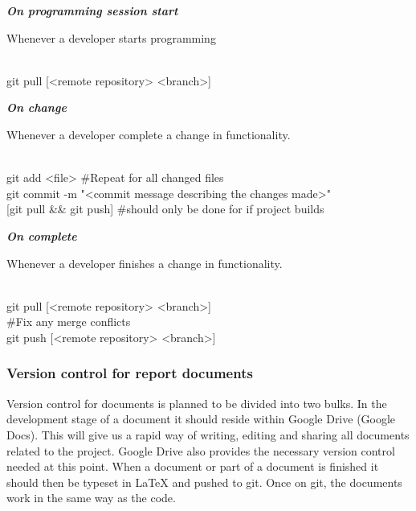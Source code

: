 \textit{\textbf{On programming session start}}
\begin{description}
	{\indentitem \item[Description:] Whenever a developer starts programming}
	{\indentitem \item[Command:] \hfill \\
		\hspace*{3em} git pull [<remote repository> <branch>]}
\end{description}

\textit{\textbf{On change}}
\begin{description}
	{\indentitem \item[Description:] Whenever a developer complete a change in functionality.}
	{\indentitem \item[Command:] \hfill \\
	\hspace*{3em} git add <file> \#Repeat for all changed files \\
	\hspace*{3em} git commit -m "<commit message describing the changes made>"\\
	\hspace*{3em} [git pull \&\& git push] \#should only be done for if project builds}
\end{description}

\textit{\textbf{On complete}}
\begin{description}
{\indentitem \item[Description:]  Whenever a developer finishes a change in functionality.}
{\indentitem \item[Command:] \hfill \\
\hspace*{3em} git pull [<remote repository> <branch>] \\ 
\hspace*{3em} \#Fix any merge conflicts \\
\hspace*{3em} git push [<remote repository> <branch>] }
\end{description}

\subsubsection{Version control for report documents}
Version control for documents is planned to be divided into two bulks. In the development stage of a document it should reside within Google Drive (Google Docs). This will give us a rapid way of writing, editing and sharing all documents related to the project. Google Drive also provides the necessary version control needed at this point. When a document or part of a document is finished it should then be typeset in LaTeX and pushed to \gls{git}. Once on \gls{git}, the documents work in the same way as the code.  


